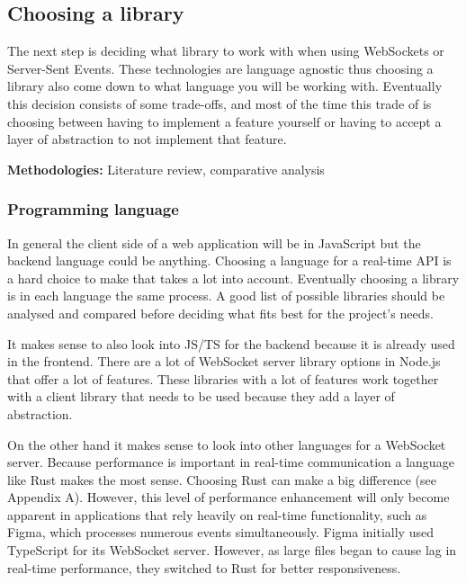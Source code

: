\newpage

\subsection{Choosing a library}

The next step is deciding what library to work with when using WebSockets or Server-Sent Events. These technologies are language agnostic thus choosing a library also come down to what language you will be working with. Eventually this decision consists of some trade-offs, and most of the time this trade of is choosing between having to implement a feature yourself or having to accept a layer of abstraction to not implement that feature.



\textbf{Methodologies:} Literature review, comparative analysis

\subsubsection{Programming language}

In general the client side of a web application will be in JavaScript but the backend language could be anything. Choosing a language for a real-time API is a hard choice to make that takes a lot into account. Eventually choosing a library is in each language the same process. A good list of possible libraries should be analysed and compared before deciding what fits best for the project's needs.

It makes sense to also look into JS/TS for the backend because it is already used in the frontend. There are a lot of WebSocket server library options in Node.js that offer a lot of features. These libraries with a lot of features work together with a client library that needs to be used because they add a layer of abstraction.

On the other hand it makes sense to look into other languages for a WebSocket server. Because performance is important in real-time communication a language like Rust makes the most sense. Choosing Rust can make a big difference (see Appendix A). However, this level of performance enhancement will only become apparent in applications that rely heavily on real-time functionality, such as Figma, which processes numerous events simultaneously. Figma initially used TypeScript for its WebSocket server. However, as large files began to cause lag in real-time performance, they switched to Rust for better responsiveness.

